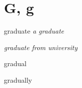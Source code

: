 \section{G, g}

\begin{word}{graduate}
    \textit{a graduate}

    \textit{graduate from university}
\end{word}

\begin{word}{gradual}
\end{word}

\begin{word}{gradually}
\end{word}
